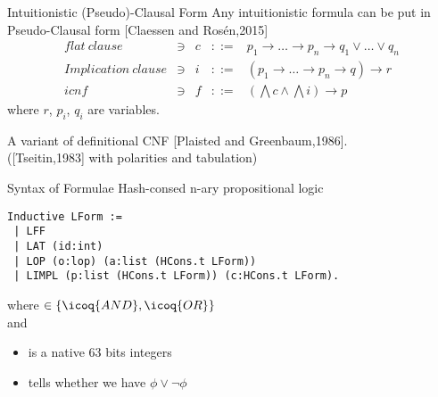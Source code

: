 \documentclass{beamer}
\begin{document}
\begin{frame}{Intuitionistic (Pseudo)-Clausal Form}
  Any intuitionistic formula can be put in Pseudo-Clausal form [Claessen and Rosén,2015]\\
  \[
    \begin{array}{lclcl}
      \mathit{flat\ clause}&\ni& c&{::=}& p_1 \to \dots \to p_n \to q_1 \lor \dots \lor q_n\\
      \mathit{Implication\ clause}&\ni& i &{::=}& (p_1 \to \dots \to p_n \to q) \to r\\
      \mathit{icnf} &\ni&   f &{::=}& (\bigwedge c \land \bigwedge i) \to p
    \end{array}
  \]
  where $r$, $p_i$, $q_i$ are variables.\\
  \bigskip

  A variant of definitional CNF [Plaisted and Greenbaum,1986].\\
  ([Tseitin,1983] with polarities and tabulation)
  
\end{frame}

\begin{frame}[fragile]{Syntax of Formulae}
Hash-consed n-ary propositional logic\\
\begin{verbatim}
Inductive LForm :=
 | LFF
 | LAT (id:int)
 | LOP (o:lop) (a:list (HCons.t LForm))
 | LIMPL (p:list (HCons.t LForm)) (c:HCons.t LForm).
\end{verbatim}
where  $\in \{ \icoq{AND} , \icoq{OR}\}$\\
and  \\
\begin{itemize}
\item {} is a native 63 bits integers
\item {} tells whether we have $\phi \lor \neg \phi$
\end{itemize}
\end{frame}
\end{document}
